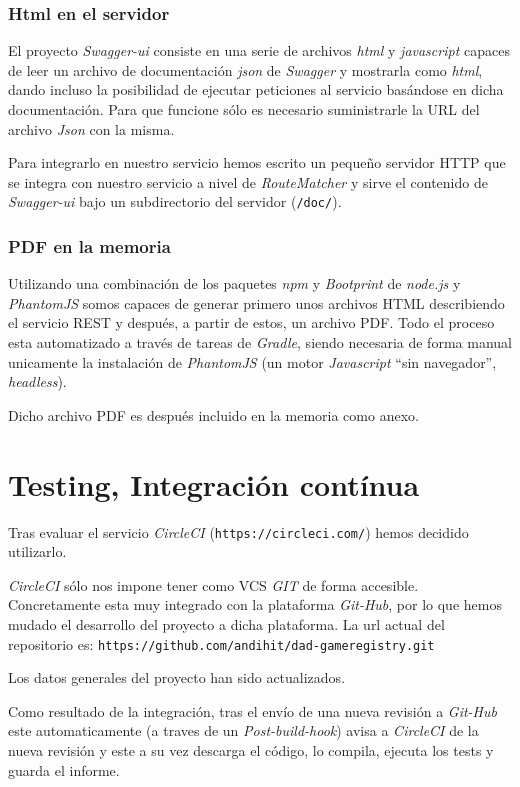 \subsubsection{Html en el servidor}
El proyecto \emph{Swagger-ui} consiste en una serie de archivos \emph{html} y \emph{javascript}
capaces de leer un archivo de documentación \emph{json} de \emph{Swagger} y mostrarla como
\emph{html}, dando incluso la posibilidad de ejecutar peticiones al servicio basándose en
dicha documentación. Para que funcione sólo es necesario suministrarle la URL del archivo
\emph{Json} con la misma.

Para integrarlo en nuestro servicio hemos escrito un pequeño servidor HTTP que se integra con
nuestro servicio a nivel de \emph{RouteMatcher} y sirve el contenido de \emph{Swagger-ui}
bajo un subdirectorio del servidor (\texttt{/doc/}).


\subsubsection{PDF en la memoria}
Utilizando una combinación de los paquetes \emph{npm} y \emph{Bootprint} de \emph{node.js} y
\emph{PhantomJS} somos capaces de generar primero unos archivos HTML describiendo el servicio
REST y después, a partir de estos, un archivo PDF. Todo el proceso esta automatizado a través
de tareas de \emph{Gradle}, siendo necesaria de forma manual unicamente la instalación de 
\emph{PhantomJS} (un motor \emph{Javascript} ``sin navegador'', \emph{headless}).

Dicho archivo PDF es después incluido en la memoria como anexo.


\section{Testing, Integración contínua}
Tras evaluar el servicio \emph{CircleCI} (\texttt{https://circleci.com/}) hemos decidido utilizarlo.

\emph{CircleCI} sólo nos impone tener como VCS \emph{GIT} de forma accesible. Concretamente esta
muy integrado con la plataforma \emph{Git-Hub}, por lo que hemos mudado el desarrollo del proyecto
a dicha plataforma. La url actual del repositorio es: 
\texttt{https://github.com/andihit/dad-gameregistry.git} 

Los datos generales del proyecto han sido actualizados.

Como resultado de la integración, tras el envío de una nueva revisión a \emph{Git-Hub} este
automaticamente (a traves de un \emph{Post-build-hook}) avisa a \emph{CircleCI} de la nueva
revisión y este a su vez descarga el código, lo compila, ejecuta los tests y guarda el informe.


